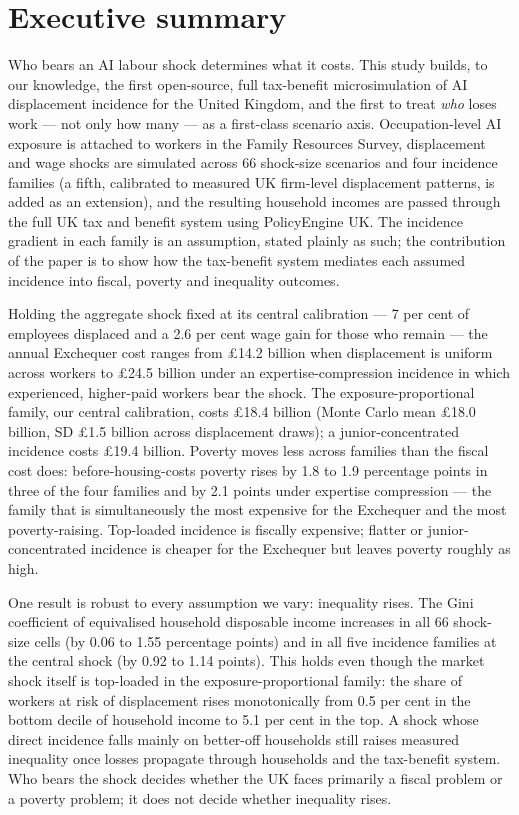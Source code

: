 \section*{Executive summary}

Who bears an AI labour shock determines what it costs. This study builds, to our knowledge, the first open-source, full tax-benefit microsimulation of AI displacement incidence for the United Kingdom, and the first to treat \emph{who} loses work --- not only how many --- as a first-class scenario axis. Occupation-level AI exposure is attached to workers in the Family Resources Survey, displacement and wage shocks are simulated across 66 shock-size scenarios and four incidence families (a fifth, calibrated to measured UK firm-level displacement patterns, is added as an extension), and the resulting household incomes are passed through the full UK tax and benefit system using PolicyEngine UK. The incidence gradient in each family is an assumption, stated plainly as such; the contribution of the paper is to show how the tax-benefit system mediates each assumed incidence into fiscal, poverty and inequality outcomes.

Holding the aggregate shock fixed at its central calibration --- 7 per cent of employees displaced and a 2.6 per cent wage gain for those who remain --- the annual Exchequer cost ranges from \pounds 14.2 billion when displacement is uniform across workers to \pounds 24.5 billion under an expertise-compression incidence in which experienced, higher-paid workers bear the shock. The exposure-proportional family, our central calibration, costs \pounds 18.4 billion (Monte Carlo mean \pounds 18.0 billion, SD \pounds 1.5 billion across displacement draws); a junior-concentrated incidence costs \pounds 19.4 billion. Poverty moves less across families than the fiscal cost does: before-housing-costs poverty rises by 1.8 to 1.9 percentage points in three of the four families and by 2.1 points under expertise compression --- the family that is simultaneously the most expensive for the Exchequer and the most poverty-raising. Top-loaded incidence is fiscally expensive; flatter or junior-concentrated incidence is cheaper for the Exchequer but leaves poverty roughly as high.

One result is robust to every assumption we vary: inequality rises. The Gini coefficient of equivalised household disposable income increases in all 66 shock-size cells (by 0.06 to 1.55 percentage points) and in all five incidence families at the central shock (by 0.92 to 1.14 points). This holds even though the market shock itself is top-loaded in the exposure-proportional family: the share of workers at risk of displacement rises monotonically from 0.5 per cent in the bottom decile of household income to 5.1 per cent in the top. A shock whose direct incidence falls mainly on better-off households still raises measured inequality once losses propagate through households and the tax-benefit system. Who bears the shock decides whether the UK faces primarily a fiscal problem or a poverty problem; it does not decide whether inequality rises.

